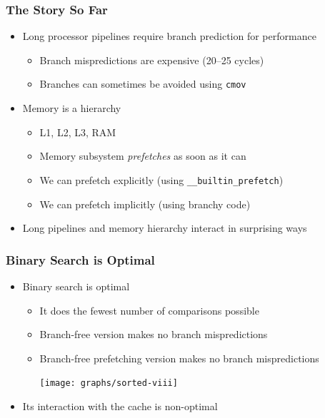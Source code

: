 \documentclass[xcolor=dvipsnames]{beamer}
\begin{document}
\begin{frame}[fragile]
   \frametitle{The Story So Far}

   \begin{itemize}
      \item<+->Long processor pipelines require branch prediction
               for performance
      \begin{itemize}
         \item<+->Branch mispredictions are expensive (20--25 cycles)
         \item<+->Branches can sometimes be avoided using 
                  \texttt{cmov}
      \end{itemize}
      \item<+->Memory is a hierarchy
      \begin{itemize}
         \item<+->L1, L2, L3, RAM%
            \only<+->{,\ldots}
         \item<+->Memory subsystem \emph{prefetches} as soon as it can
         \item<+->We can prefetch explicitly (using \texttt{__builtin_prefetch})
         \item<+->We can prefetch implicitly (using branchy code)
      \end{itemize}
      \item<+->Long pipelines and memory hierarchy interact in surprising
               ways
   \end{itemize}
\end{frame}


\begin{frame}
   \frametitle{Binary Search is Optimal}

   \begin{itemize}[<+->]
     \item Binary search is optimal 
     \begin{itemize}
       \item It does the fewest number of comparisons possible
       \item Branch-free version makes no branch mispredictions
       \item Branch-free prefetching version makes no branch mispredictions\\
        \centerline{\texttt{[image: graphs/sorted-viii]}}
     \end{itemize}
     \item Its interaction with the cache is non-optimal
   \end{itemize}
\end{frame}
\end{document}
